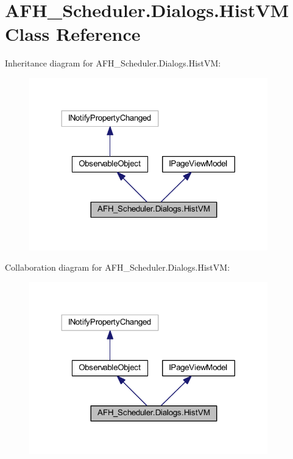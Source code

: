 \section{A\+F\+H\+\_\+\+Scheduler.\+Dialogs.\+Hist\+VM Class Reference}
\label{class_a_f_h___scheduler_1_1_dialogs_1_1_hist_v_m}


Inheritance diagram for A\+F\+H\+\_\+\+Scheduler.\+Dialogs.\+Hist\+VM\+:
\nopagebreak
\begin{figure}[H]
\begin{center}
\leavevmode
\includegraphics[width=293pt]{class_a_f_h___scheduler_1_1_dialogs_1_1_hist_v_m__inherit__graph}
\end{center}
\end{figure}


Collaboration diagram for A\+F\+H\+\_\+\+Scheduler.\+Dialogs.\+Hist\+VM\+:
\nopagebreak
\begin{figure}[H]
\begin{center}
\leavevmode
\includegraphics[width=293pt]{class_a_f_h___scheduler_1_1_dialogs_1_1_hist_v_m__coll__graph}
\end{center}
\end{figure}
